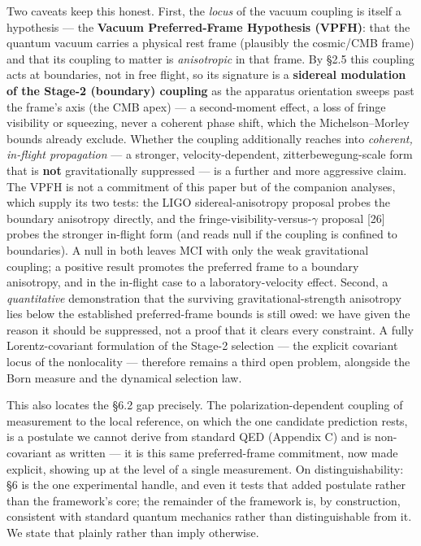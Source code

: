 \documentclass[
]{article}
\begin{document}
Two caveats keep this honest. First, the \emph{locus} of the vacuum
coupling is itself a hypothesis --- the \textbf{Vacuum Preferred-Frame
Hypothesis (VPFH)}: that the quantum vacuum carries a physical rest
frame (plausibly the cosmic/CMB frame) and that its coupling to matter
is \emph{anisotropic} in that frame. By §2.5 this coupling acts at
boundaries, not in free flight, so its signature is a \textbf{sidereal
modulation of the Stage-2 (boundary) coupling} as the apparatus
orientation sweeps past the frame's axis (the CMB apex) --- a
second-moment effect, a loss of fringe visibility or squeezing, never a
coherent phase shift, which the Michelson--Morley bounds already
exclude. Whether the coupling additionally reaches into \emph{coherent,
in-flight propagation} --- a stronger, velocity-dependent,
zitterbewegung-scale form that is \textbf{not} gravitationally
suppressed --- is a further and more aggressive claim. The VPFH is not a
commitment of this paper but of the companion analyses, which supply its
two tests: the LIGO sidereal-anisotropy proposal probes the boundary
anisotropy directly, and the fringe-visibility-versus-\(\gamma\)
proposal {[}26{]} probes the stronger in-flight form (and reads null if
the coupling is confined to boundaries). A null in both leaves MCI with
only the weak gravitational coupling; a positive result promotes the
preferred frame to a boundary anisotropy, and in the in-flight case to a
laboratory-velocity effect. Second, a \emph{quantitative} demonstration
that the surviving gravitational-strength anisotropy lies below the
established preferred-frame bounds is still owed: we have given the
reason it should be suppressed, not a proof that it clears every
constraint. A fully Lorentz-covariant formulation of the Stage-2
selection --- the explicit covariant locus of the nonlocality ---
therefore remains a third open problem, alongside the Born measure and
the dynamical selection law.

This also locates the §6.2 gap precisely. The polarization-dependent
coupling of measurement to the local reference, on which the one
candidate prediction rests, is a postulate we cannot derive from
standard QED (Appendix C) and is non-covariant as written --- it is this
same preferred-frame commitment, now made explicit, showing up at the
level of a single measurement. On distinguishability: §6 is the one
experimental handle, and even it tests that added postulate rather than
the framework's core; the remainder of the framework is, by
construction, consistent with standard quantum mechanics rather than
distinguishable from it. We state that plainly rather than imply
otherwise.
\end{document}
